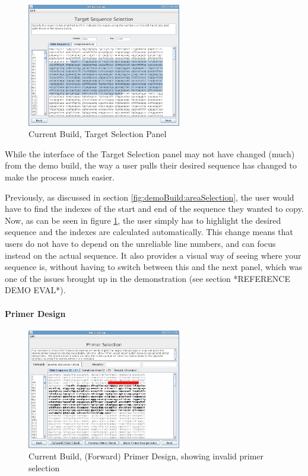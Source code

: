 \begin{figure}[h]
  \begin{center}
    \includegraphics[width=0.6\textwidth]{./images/currentBuild/areaSelection.png}
    \caption{
      \label{fig:currentBuild:areaSelection}
      Current Build, Target Selection Panel
    }
  \end{center}
\end{figure}

While the interface of the Target Selection panel may not have changed
(much) from the demo build, the way a user pulls their desired
sequence has changed to make the process much easier.

Previously, as discussed in section \ref{fig:demoBuild:areaSelection},
the user would have to find the indexes of the start and end of the
sequence they wanted to copy.
Now, as can be seen in figure \ref{fig:currentBuild:areaSelection},
the user simply has to highlight the desired sequence and the indexes
are calculated automatically.
This change means that users do not have to depend on the unreliable
line numbers, and can focus instead on the actual sequence.
It also provides a visual way of seeing where your sequence is,
without having to switch between this and the next panel, which was
one of the issues brought up in the demonstration (see section
*REFERENCE DEMO EVAL*).

\paragraph{Primer Design}

\begin{figure}[h]
  \begin{center}
    \includegraphics[width=0.6\textwidth]{./images/currentBuild/forwardPrimerDesignRed.png}
    \caption{
      \label{fig:currentBuild:forwardPrimerDesignRed}
      Current Build, (Forward) Primer Design, showing invalid primer selection
    }
  \end{center}
\end{figure}

